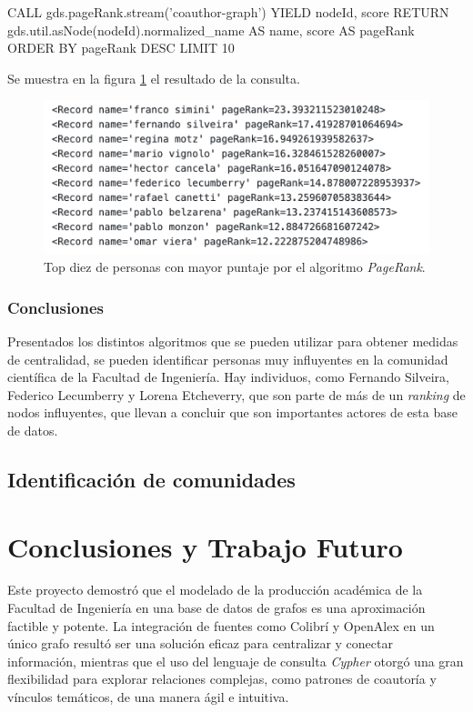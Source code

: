 \documentclass[journal]{IEEEtran}
\begin{document}
\begin{sflisting}[style=sparql,caption= PageRank,label=codigo2]
	CALL gds.pageRank.stream('coauthor-graph')
	YIELD nodeId, score
	RETURN gds.util.asNode(nodeId).normalized_name
	AS name, score AS pageRank
	ORDER BY pageRank DESC
	LIMIT 10
\end{sflisting}

Se muestra en la figura \ref{fig:page_rank} el resultado de la consulta.

\begin{figure}[b]
	\centering
	\includegraphics[width=\linewidth]{imagenes/pagerank.png}
	\caption{Top diez de personas con mayor puntaje por el algoritmo \textit{PageRank}.}
	\label{fig:page_rank}
\end{figure}



\subsubsection{Conclusiones}
Presentados los distintos algoritmos que se pueden utilizar para obtener medidas de centralidad, se pueden identificar personas muy influyentes en la comunidad científica de la Facultad de Ingeniería. Hay individuos, como Fernando Silveira, Federico Lecumberry y Lorena Etcheverry, que son parte de más de un \textit{ranking} de nodos influyentes, que llevan a concluir que son importantes actores de esta base de datos.

\subsection{Identificación de comunidades}







\section{Conclusiones y Trabajo Futuro}
\label{conclusion}
Este proyecto demostró que el modelado de la producción académica de la Facultad de Ingeniería en una base de datos de grafos es una aproximación factible y potente. La integración de fuentes como Colibrí y OpenAlex en un único grafo resultó ser una solución eficaz para centralizar y conectar información, mientras que el uso del lenguaje de consulta \textit{Cypher} otorgó una gran flexibilidad para explorar relaciones complejas, como patrones de coautoría y vínculos temáticos, de una manera ágil e intuitiva.
\end{document}
